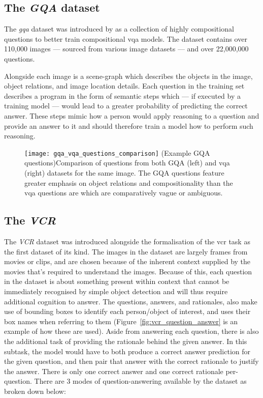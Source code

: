 \subsection{The \textit{GQA} dataset}
\label{subsec:gqa_dataset}

The \textit{\gls{gqa}} dataset was introduced by \citeauthor{hudson_gqa_2019}\cite{hudson_gqa_2019} as a collection of highly compositional questions to better train compositional \gls{vqa} models.
The dataset contains over 110,000 images --- sourced from various image datasets --- and over 22,000,000 questions.

Alongside each image is a scene-graph which describes the objects in the image, object relations, and image location details.
Each question in the training set describes a program in the form of semantic steps which --- if executed by a training model --- would lead to a greater probability of predicting the correct answer.
These steps mimic how a person would apply reasoning to a question and provide an answer to it and should therefore train a model how to perform such reasoning.

\begin{figure}[htbp]
    \centering
    \texttt{[image: gqa\_vqa\_questions\_comparison]}
    \captionsource(Example GQA questions){Comparison of questions from both GQA (left) and \gls{vqa} (right) datasets for the same image. The GQA questions feature greater emphasis on object relations and compositionality than the \gls{vqa} questions are which are comparatively vague or ambiguous. \label{fig:gqa_and_vqa_questions_compared}}{\citeauthor{hudson_gqa_2019}\cite{hudson_gqa_2019}}
\end{figure}

\subsection{The \textit{VCR}}
\label{subsec:vcr_dataset}

The \textit{VCR} dataset \cite{zellers_recognition_2019} was introduced alongside the formalisation of the \gls{vcr} task as the first dataset of its kind.
The images in the dataset are largely frames from movies or clips, and are chosen because of the inherent context supplied by the movies that's required to understand the images.
Because of this, each question in the dataset is about something present within context that cannot be immediately recognised by simple object detection and will thus require additional cognition to answer.
The questions, answers, and rationales, also make use of bounding boxes to identify each person/object of interest, and uses their box names when referring to them (Figure~\ref{fig:vcr_question_answer} is an example of how these are used).
Aside from answering each question, there is also the additional task of providing the rationale behind the given answer.
In this subtask, the model would have to both produce a correct answer prediction for the given question, and then pair that answer with the correct rationale to justify the answer.
There is only one correct answer and one correct rationale per-question.
There are 3 modes of question-answering available by the dataset as broken down below:

